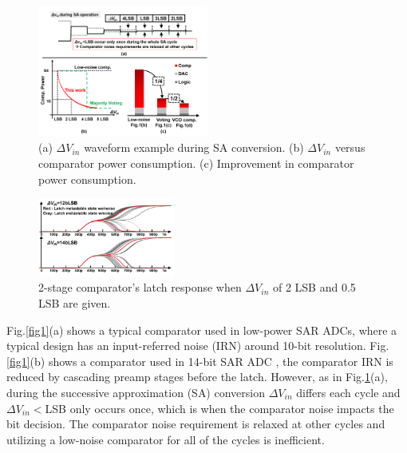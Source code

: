 \documentclass[journal]{IEEEtran}
\begin{document}
\begin{figure}[!]
\centering
 \includegraphics[width=0.5\textwidth]{figs/fig2.png}
  \caption{(a) $\Delta V_{in}$ waveform example during SA conversion.
  (b) $\Delta V_{in}$ versus comparator power consumption.
(c) Improvement in comparator power consumption.
}
  \label{fig2}
\end{figure}
\begin{figure}[!]
\centering
 \includegraphics[width=0.4\textwidth]{figs/conventional-strongarm.png}
  \caption{2-stage comparator's latch response when $\Delta V_{in}$ of 2 LSB and 0.5 LSB are given.}
  \label{meta}
\end{figure}

Fig.\ref{fig1}(a) shows a typical comparator used in low-power SAR ADCs\cite{miyahara2008low}, where a typical design has an input-referred noise (IRN) around 10-bit resolution. Fig.\ref{fig1}(b) shows a comparator used in 14-bit SAR ADC \cite{hesener200714b}, the comparator IRN is reduced by cascading preamp stages before the latch. However, as in Fig.\ref{fig2}(a), during the successive approximation (SA) conversion $\Delta V_{in}$ differs each cycle and $\Delta V_{in}<$LSB only occurs once, which is when the comparator noise impacts the bit decision. The comparator noise requirement is relaxed at other cycles and utilizing a low-noise comparator for all of the cycles is inefficient. 
\end{document}
